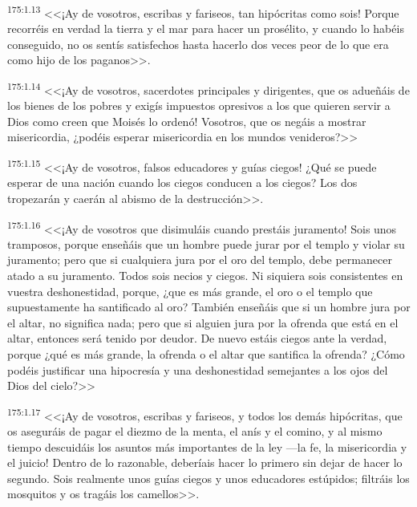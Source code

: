 \par 
\textsuperscript{175:1.13} <<¡Ay de vosotros, escribas y fariseos, tan hipócritas como sois! Porque recorréis en verdad la tierra y el mar para hacer un prosélito, y cuando lo habéis conseguido, no os sentís satisfechos hasta hacerlo dos veces peor de lo que era como hijo de los paganos>>.

\par 
\textsuperscript{175:1.14} <<¡Ay de vosotros, sacerdotes principales y dirigentes, que os adueñáis de los bienes de los pobres y exigís impuestos opresivos a los que quieren servir a Dios como creen que Moisés lo ordenó! Vosotros, que os negáis a mostrar misericordia, ¿podéis esperar misericordia en los mundos venideros?>>

\par 
\textsuperscript{175:1.15} <<¡Ay de vosotros, falsos educadores y guías ciegos! ¿Qué se puede esperar de una nación cuando los ciegos conducen a los ciegos? Los dos tropezarán y caerán al abismo de la destrucción>>.

\par 
\textsuperscript{175:1.16} <<¡Ay de vosotros que disimuláis cuando prestáis juramento! Sois unos tramposos, porque enseñáis que un hombre puede jurar por el templo y violar su juramento; pero que si cualquiera jura por el oro del templo, debe permanecer atado a su juramento. Todos sois necios y ciegos. Ni siquiera sois consistentes en vuestra deshonestidad, porque, ¿que es más grande, el oro o el templo que supuestamente ha santificado al oro? También enseñáis que si un hombre jura por el altar, no significa nada; pero que si alguien jura por la ofrenda que está en el altar, entonces será tenido por deudor. De nuevo estáis ciegos ante la verdad, porque ¿qué es más grande, la ofrenda o el altar que santifica la ofrenda? ¿Cómo podéis justificar una hipocresía y una deshonestidad semejantes a los ojos del Dios del cielo?>>

\par 
\textsuperscript{175:1.17} <<¡Ay de vosotros, escribas y fariseos, y todos los demás hipócritas, que os aseguráis de pagar el diezmo de la menta, el anís y el comino, y al mismo tiempo descuidáis los asuntos más importantes de la ley ---la fe, la misericordia y el juicio! Dentro de lo razonable, deberíais hacer lo primero sin dejar de hacer lo segundo. Sois realmente unos guías ciegos y unos educadores estúpidos; filtráis los mosquitos y os tragáis los camellos>>.

